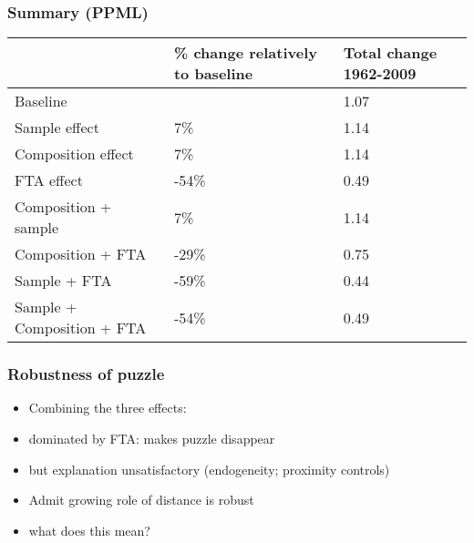 \documentclass{beamer}
\begin{document}
\begin{frame}[plain]\frametitle{Summary (PPML)}
\begin{table}[H]
\begin{center}
\begin{tabular}{|l|p{1in}|p{1in}|}
\hline
           & {\bf \% change relatively to baseline} & {\bf Total change 1962-2009} \\
\hline
Baseline  &     &  1.07 \\
\hline
Sample effect &        7\% &    1.14 \\
\hline
Composition effect &         7\% &     1.14 \\
\hline
FTA effect &        -54\% &         0.49 \\
\hline
Composition + sample &          7\% &         1.14 \\
\hline
Composition + FTA &      -29\% &        0.75 \\
\hline
Sample + FTA &       -59\%   &       0.44 \\
\hline
Sample + Composition + FTA &     -54\% &    0.49 \\
\hline
\end{tabular}
\end{center}
\end{table}
\end{frame}
\begin{frame}[plain]\frametitle{Robustness of puzzle}
\vspace{0.3cm}
\begin{itemize}
\item Combining the three effects:
\item dominated by FTA: makes puzzle disappear
\item but explanation unsatisfactory (endogeneity; proximity controls)
\vspace{.3cm}
\item Admit growing role of distance is robust
\item what does this mean?
\end{itemize}
\end{frame}
\fi
\end{document}
